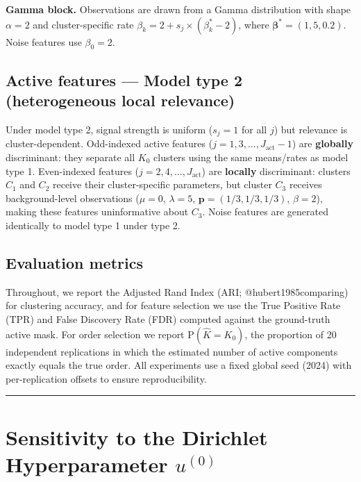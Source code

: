\documentclass[
  letterpaper,
  DIV=11,
  numbers=noendperiod]{scrartcl}
\begin{document}
\textbf{Gamma block.} Observations are drawn from a Gamma distribution
with shape \(\alpha = 2\) and cluster-specific rate
\(\beta_k = 2 + s_j \times (\beta^*_k - 2)\), where
\(\bm{\beta}^* = (1, 5, 0.2)\). Noise features use \(\beta_0 = 2\).

\subsection{Active features --- Model type 2 (heterogeneous local
relevance)}\label{active-features-model-type-2-heterogeneous-local-relevance}

Under model type 2, signal strength is uniform (\(s_j = 1\) for all
\(j\)) but relevance is cluster-dependent. Odd-indexed active features
(\(j = 1, 3, \ldots, J_{\text{act}} - 1\)) are \textbf{globally}
discriminant: they separate all \(K_0\) clusters using the same
means/rates as model type 1. Even-indexed features
(\(j = 2, 4, \ldots, J_{\text{act}}\)) are \textbf{locally}
discriminant: clusters \(C_1\) and \(C_2\) receive their
cluster-specific parameters, but cluster \(C_3\) receives
background-level observations (\(\mu = 0\), \(\lambda = 5\),
\(\bm{p} = (1/3, 1/3, 1/3)\), \(\beta = 2\)), making these features
uninformative about \(C_3\). Noise features are generated identically to
model type 1 under type 2.

\subsection{Evaluation metrics}\label{evaluation-metrics}

Throughout, we report the Adjusted Rand Index (ARI;
@hubert1985comparing) for clustering accuracy, and for feature selection
we use the True Positive Rate (TPR) and False Discovery Rate (FDR)
computed against the ground-truth active mask. For order selection we
report \(\mathrm{P}(\widehat{K} = K_0)\), the proportion of 20
independent replications in which the estimated number of active
components exactly equals the true order. All experiments use a fixed
global seed (2024) with per-replication offsets to ensure
reproducibility.

\begin{center}\rule{0.5\linewidth}{0.5pt}\end{center}

\section{\texorpdfstring{Sensitivity to the Dirichlet Hyperparameter
\(u^{(0)}\)}{Sensitivity to the Dirichlet Hyperparameter u\^{}\{(0)\}}}\label{sec-order-selection}
\end{document}
